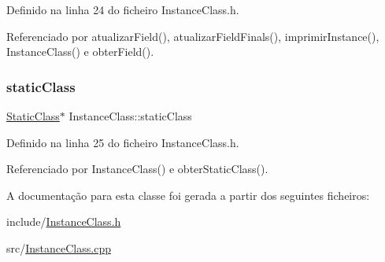 Definido na linha 24 do ficheiro Instance\+Class.\+h.



Referenciado por atualizar\+Field(), atualizar\+Field\+Finals(), imprimir\+Instance(), Instance\+Class() e obter\+Field().

\mbox{\label{classInstanceClass_a45804f1afe3666a4b4511cf8e3f1013b}} 
\subsubsection{\texorpdfstring{static\+Class}{staticClass}}
{\footnotesize\ttfamily \hyperlink{classStaticClass}{Static\+Class}$\ast$ Instance\+Class\+::static\+Class\hspace{0.3cm}{\ttfamily [private]}}



Definido na linha 25 do ficheiro Instance\+Class.\+h.



Referenciado por Instance\+Class() e obter\+Static\+Class().



A documentação para esta classe foi gerada a partir dos seguintes ficheiros\+:\begin{DoxyCompactItemize}
\item 
include/\hyperlink{InstanceClass_8h}{Instance\+Class.\+h}\item 
src/\hyperlink{InstanceClass_8cpp}{Instance\+Class.\+cpp}\end{DoxyCompactItemize}
